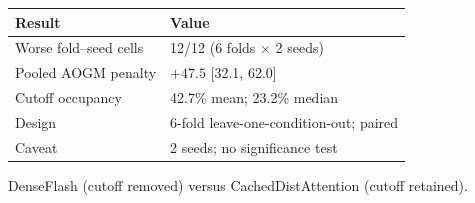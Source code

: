 \begin{frame}
  \centering
  \small
  \renewcommand{\arraystretch}{1.35}
  \begin{tabular}{@{}p{58mm}p{72mm}@{}}
    \toprule
    \textbf{Result} & \textbf{Value}\\
    \midrule
    Worse fold--seed cells & 12/12 (6 folds $\times$ 2 seeds)\\
    Pooled AOGM penalty & $+47.5$ [32.1, 62.0]\\
    Cutoff occupancy & 42.7\% mean; 23.2\% median\\
    Design & 6-fold leave-one-condition-out; paired\\
    Caveat & 2 seeds; no significance test\\
    \bottomrule
  \end{tabular}
  \vspace{4mm}

  {\footnotesize DenseFlash (cutoff removed) versus CachedDistAttention (cutoff retained).\par}
\end{frame}

